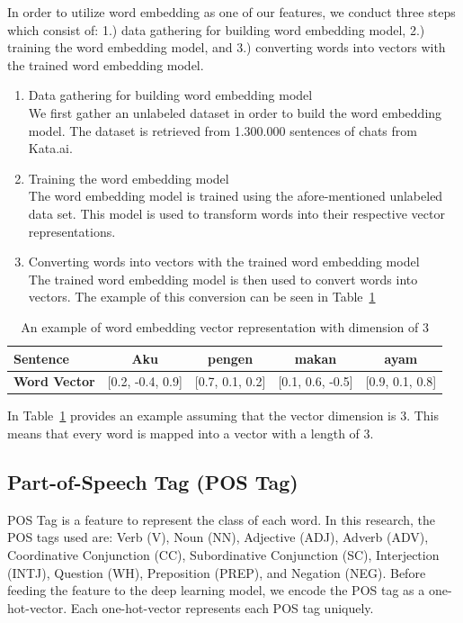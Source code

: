 In order to utilize word embedding as one of our features, we conduct three steps which consist of: 1.) data gathering for building word embedding model, 2.) training the word embedding model, and 3.) converting words into vectors with the trained word embedding model.

\begin{enumerate}
	\item Data gathering for building word embedding model\\
	We first gather an unlabeled dataset in order to build the word embedding model. The dataset is retrieved from 1.300.000 sentences of chats from Kata.ai.
	
	\item Training the word embedding model\\
	The word embedding model is trained using the afore-mentioned unlabeled data set. This model is used to transform words into their respective vector representations.
	
	\item Converting words into vectors with the trained word embedding model\\
	The trained word embedding model is then used to convert words into vectors. The example of this conversion can be seen in Table~\ref{tab:examplewe}
\end{enumerate}

\begin{table}
	\centering
	\caption{An example of word embedding vector representation with dimension of 3}
	\label{tab:examplewe}
	\begin{tabular}{|lcccc|}
		\hline
		\textbf{Sentence} 				& Aku & pengen & makan & ayam \\
		\hline
		\textbf{Word Vector}		& [0.2, -0.4, 0.9] & [0.7, 0.1, 0.2] & [0.1, 0.6, -0.5] & [0.9, 0.1, 0.8] \\
		\hline
	\end{tabular}
\end{table}

In Table~\ref{tab:examplewe} provides an example assuming that the vector dimension is 3. This means that every word is mapped into a vector with a length of 3.

\subsection{Part-of-Speech Tag (POS Tag)}
POS Tag is a feature to represent the class of each word. In this research, the POS tags used are: Verb (V), Noun (NN), Adjective (ADJ), Adverb (ADV), Coordinative Conjunction (CC), Subordinative Conjunction (SC), Interjection (INTJ), Question (WH), Preposition (PREP), and Negation (NEG). Before feeding the feature to the deep learning model, we encode the POS tag as a one-hot-vector. Each one-hot-vector represents each POS tag uniquely.

